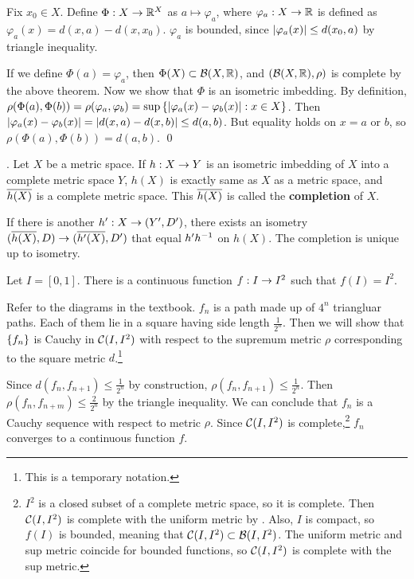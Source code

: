 \pf Fix \(x_0 \in X\). Define \(\Phi: X \rightarrow \mathbb{R}^X\) as \(a \mapsto \varphi_a\), where \(\varphi_a : X \rightarrow \mathbb{R}\) is defined as \(\varphi_a(x) = d(x, a) - d(x, x_0)\). \(\varphi_a\) is bounded, since \(\left| \varphi_a(x) \right| \leq d(x_0, a)\) by triangle inequality.

If we define \(\Phi(a) = \varphi_a\), then \(\Phi(X) \subset \mathcal{B}(X, \mathbb{R})\), and \((\mathcal{B}(X, \mathbb{R}), \rho)\) is complete by the above theorem. Now we show that \(\Phi\) is an isometric imbedding. By definition, \(\rho(\Phi(a), \Phi(b)) = \rho(\varphi_a, \varphi_b) = \sup\left\{ \left| \varphi_a(x) - \varphi_b(x) \right| : x \in X\right\}\). Then \(\left| \varphi_a(x) - \varphi_b(x) \right| = \left| d(x, a) - d(x, b) \right| \leq d(a, b)\). But equality holds on \(x = a\) or \(b\), so \(\rho(\Phi(a), \Phi(b)) = d(a, b)\). \qed

. Let \(X\) be a metric space. If \(h : X \rightarrow Y\) is an isometric imbedding of \(X\) into a complete metric space \(Y\), \(h(X)\) is exactly same as \(X\) as a metric space, and \(\overline{h(X)}\) is a complete metric space. This \(\overline{h(X)}\) is called the \textbf{completion} of \(X\).

If there is another \(h' : X \rightarrow (Y', D')\), there exists an isometry \((\overline{h(X)}, D) \rightarrow (\overline{h'(X)}, D')\) that equal \(h'h^{-1}\) on \(h(X)\). The completion is unique up to isometry.


 Let \(I = [0, 1]\). There is a continuous function \(f : I \rightarrow I^2\) such that \(f(I) = I^2\).

\pf Refer to the diagrams in the textbook. \(f_n\) is a path made up of \(4^n\) triangluar paths. Each of them lie in a square having side length \(\frac{1}{2^n}\). Then we will show that \(\left\{ f_n \right\}\) is Cauchy in \(\mathcal{C}(I, I^2)\) with respect to the supremum metric \(\rho\) corresponding to the square metric \(d\).\footnote{This is a temporary notation.}

Since \(d(f_n, f_{n+1}) \leq \frac{1}{2^n}\) by construction, \(\rho(f_n, f_{n+1}) \leq \frac{1}{2^n}\). Then \(\rho(f_n, f_{n+m}) \leq \frac{2}{2^n}\) by the triangle inequality. We can conclude that \(f_n\) is a Cauchy sequence with respect to metric \(\rho\). Since \(\mathcal{C}(I, I^2)\) is complete,\footnote{\(I^2\) is a closed subset of a complete metric space, so it is complete. Then \(\mathcal{C}(I, I^2)\) is complete with the uniform metric by . Also, \(I\) is compact, so \(f(I)\) is bounded, meaning that \(\mathcal{C}(I, I^2) \subset \mathcal{B}(I, I^2)\). The uniform metric and sup metric coincide for bounded functions, so \(\mathcal{C}(I, I^2)\) is complete with the sup metric.} \(f_n\) converges to a continuous function \(f\).

